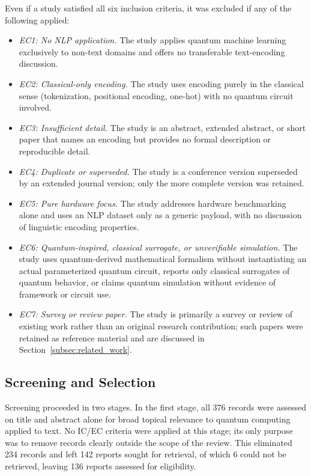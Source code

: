\documentclass{ieeeaccess}
\begin{document}
Even if a study satisfied all six inclusion criteria, it was excluded if any of the following applied:
\begin{itemize}
    \item \textit{EC1: No NLP application.} The study applies quantum machine learning exclusively to non-text domains and offers no transferable text-encoding discussion.

    \item \textit{EC2: Classical-only encoding.} The study uses encoding purely in the classical sense (tokenization, positional encoding, one-hot) with no quantum circuit involved.

    \item \textit{EC3: Insufficient detail.} The study is an abstract, extended abstract, or short paper that names an encoding but provides no formal description or reproducible detail.

    \item \textit{EC4: Duplicate or superseded.} The study is a conference version superseded by an extended journal version; only the more complete version was retained.

    \item \textit{EC5: Pure hardware focus.} The study addresses hardware benchmarking alone and uses an NLP dataset only as a generic payload, with no discussion of linguistic encoding properties.

    \item \textit{EC6: Quantum-inspired, classical surrogate, or unverifiable simulation.} The study uses quantum-derived mathematical formalism without instantiating an actual parameterized quantum circuit, reports only classical surrogates of quantum behavior, or claims quantum simulation without evidence of framework or circuit use.

    \item \textit{EC7: Survey or review paper.} The study is primarily a survey or review of existing work rather than an original research contribution; such papers were retained as reference material and are discussed in Section~\ref{subsec:related_work}.
\end{itemize}

\subsection{Screening and Selection}
\label{subsec:screening}

Screening proceeded in two stages. In the first stage, all 376 records were assessed on title and abstract alone for broad topical relevance to quantum computing applied to text. No IC/EC criteria were applied at this stage; its only purpose was to remove records clearly outside the scope of the review. This eliminated 234 records and left 142 reports sought for retrieval, of which 6 could not be retrieved, leaving 136 reports assessed for eligibility.
\end{document}
